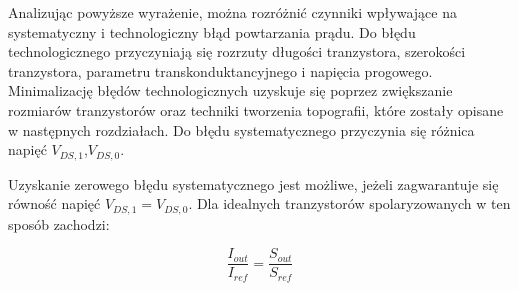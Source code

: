 \documentclass[10pt,a4paper,twoside]{report}
\theoremstyle{definition}
\theoremstyle{definition}
\theoremstyle{definition}
\theoremstyle{definition}
\theoremstyle{definition}
\begin{document}
{{	{	Analizując powyższe wyrażenie, można rozróżnić czynniki wpływające na systematyczny i technologiczny błąd powtarzania prądu. Do błędu technologicznego przyczyniają się rozrzuty długości tranzystora, szerokości tranzystora, parametru transkonduktancyjnego i napięcia progowego. Minimalizację błędów technologicznych uzyskuje się poprzez zwiększanie rozmiarów tranzystorów oraz techniki tworzenia topografii, które zostały opisane w następnych rozdziałach. Do błędu systematycznego przyczynia się różnica napięć $V_{DS,1}$,$V_{DS,0}$. }

	{	Uzyskanie zerowego błędu systematycznego jest możliwe, jeżeli zagwarantuje się równość napięć $V_{DS,1} = V_{DS,0}$. Dla idealnych tranzystorów spolaryzowanych w ten sposób zachodzi:
		
		\begin{equation}
		\frac{I_{out}}{I_{ref}} = \frac{S_{out}}{S_{ref}}
		\end{equation}
	}

}}
\end{document}
